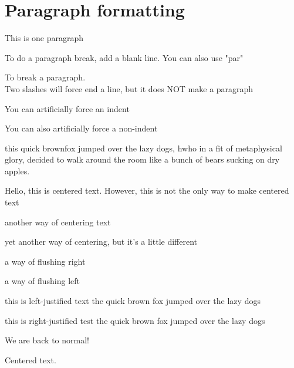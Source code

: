 \documentclass[12pt]{report}
\begin{document}
\chapter{Paragraph formatting}
\setlength{\parindent}{10ex} %
\setlength{\parskip}{1em} %


This is one paragraph 

To do a paragraph break, add a blank line. You can also use "par"\par 
To break a paragraph.\\ 
Two slashes will force end a line, but it does NOT make a paragraph 

\indent \indent You can artificially force an indent 

\noindent You can also artificially force a non-indent 

this quick brownfox jumped over the lazy dogs, hwho in a fit of metaphysical glory, decided to walk around the room like a bunch of bears sucking on dry apples. 

\begin{center}
Hello, this is centered text. However, this is not the only way to make centered text
\end{center}


{ \centering another way of centering text %
 
}

{\hfill yet another way of centering, but it's a little different \hfill}

{\hfill a way of flushing right}

{a way of flushing left\hfill }


\begin{flushleft}
this is left-justified text the quick brown fox jumped over the lazy dogs 
\end{flushleft}

\begin{flushright}
this is right-justified test the quick brown fox jumped over the lazy dogs 
\end{flushright}

We are back to normal! 

\pagebreak
\hspace{0pt} %
\vfill
Centered text.
\vfill
\hspace{0pt}
\pagebreak
\end{document}
